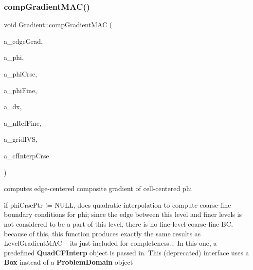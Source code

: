 \subsubsection{\texorpdfstring{comp\+Gradient\+M\+A\+C()}{compGradientMAC()}\hspace{0.1cm}{\footnotesize\ttfamily [3/3]}}
{\footnotesize\ttfamily void Gradient\+::comp\+Gradient\+M\+AC (\begin{DoxyParamCaption}\item[{\textbf{ Level\+Data}$<$ \textbf{ Flux\+Box} $>$ \&}]{a\+\_\+edge\+Grad,  }\item[{\textbf{ Level\+Data}$<$ \textbf{ F\+Array\+Box} $>$ \&}]{a\+\_\+phi,  }\item[{const \textbf{ Level\+Data}$<$ \textbf{ F\+Array\+Box} $>$ $\ast$}]{a\+\_\+phi\+Crse,  }\item[{const \textbf{ Level\+Data}$<$ \textbf{ F\+Array\+Box} $>$ $\ast$}]{a\+\_\+phi\+Fine,  }\item[{const \textbf{ Real}}]{a\+\_\+dx,  }\item[{const int}]{a\+\_\+n\+Ref\+Fine,  }\item[{const \textbf{ Layout\+Data}$<$ \textbf{ Int\+Vect\+Set} $>$ \&}]{a\+\_\+grid\+I\+VS,  }\item[{\textbf{ Quad\+C\+F\+Interp} \&}]{a\+\_\+cf\+Interp\+Crse }\end{DoxyParamCaption})\hspace{0.3cm}{\ttfamily [static]}}



computes edge-\/centered composite gradient of cell-\/centered phi 

if phi\+Crse\+Ptr != N\+U\+LL, does quadratic interpolation to compute coarse-\/fine boundary conditions for phi; since the edge between this level and finer levels is not considered to be a part of this level, there is no fine-\/level coarse-\/fine BC. because of this, this function produces exactly the same results as Level\+Gradient\+M\+AC -- it\textquotesingle{}s just included for completeness... In this one, a predefined \textbf{ Quad\+C\+F\+Interp} object is passed in. This (deprecated) interface uses a \textbf{ Box} instead of a \textbf{ Problem\+Domain} object \mbox{\label{class_gradient_a85f5cea4187536e8430d485a306b131d}} 
